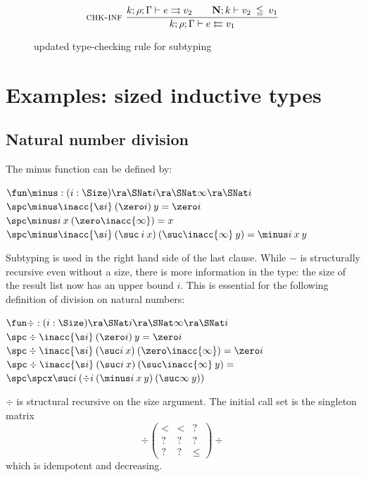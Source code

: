 \begin{figure}[htp]

\begin{gather*}
\mbox{\sc chk-inf}\ \dfrac{k;\rho;\Gamma\vdash e\rightrightarrows v_2
\qquad
{\mathbf{N};k\vdash v_2\:\leqq\:v_1}}{k;\rho;\Gamma\vdash e\leftleftarrows v_1}
\end{gather*}
\caption{updated type-checking rule for subtyping}
\label{fnews}
\end{figure}

\section{Examples: sized inductive types }

\subsection{Natural number division}

The minus function can be defined by:
\begin{bsp}
$\fun \minus : (i : \Size ) \ra \SNat i \ra \SNat \infty \ra \SNat i$\\
$\spc \minus \inacc{\s i} \: (\zero i) \:  y = \zero i $ \\
$\spc \minus i \: x \: (\zero \inacc{\infty})  = x $\\
$\spc \minus \inacc{\s i} \: (\suc \: i \: x) \: (\suc \inacc{\infty} \: y) = \minus i \: x \: y $
\end{bsp}
Subtyping is used in the right hand side of the last clause.
While $\minus$ is structurally recursive even without a size, 
there is more information in the type: the size of the result list now has an upper bound $i$.
This is essential for the following definition of division on natural numbers:
\begin{bsp}
$\fun \div : ( i : \Size )  \ra  \SNat i \ra \SNat \infty \ra \SNat i$\\
$\spc \div \inacc{\s i} \: (\zero i) \: y = \zero i$\\
$\spc \div \inacc{\s i} \: (\suc i \: x) \: (\zero \inacc{\infty})  = \zero i$\\
$\spc \div \inacc{\s i} \: (\suc i \: x) \: (\suc \inacc{\infty} \: y) = $\\
$\spc \spcx \suc i \: (\div i \: (\minus i \: x \:y) \: (\suc \infty \: y))$
\end{bsp}
$\div$ is structural recursive on the size argument.
The initial call set is the singleton matrix
\[
\div
\begin{pmatrix}
<    &  <  & ? \\
?    &  ?  &  ? \\
?    &  ?  & \leq 
\end{pmatrix}\div
\] 
which is idempotent and decreasing.

